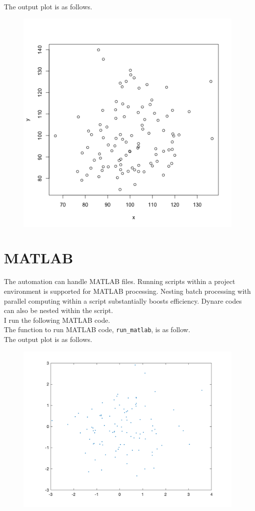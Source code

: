 \documentclass[12pt, a4paper]{article}
\begin{document}


The output plot is as follows.\\

\begin{figure}[H]
	\includegraphics[width=.5\textwidth]{sample_r_graph.png}
\end{figure}

\section{MATLAB}

The automation can handle MATLAB files. Running scripts within a project environment is supported for MATLAB processing. Nesting batch processing with parallel computing within a script substantially boosts efficiency. Dynare codes can also be nested within the script.\\

I run the following MATLAB code.\\



The function to run MATLAB code, \texttt{run\_matlab}, is as follow.\\



The output plot is as follows.\\

\begin{figure}[H]
	\includegraphics[width=.5\textwidth]{sample_matlab_graph.png}
\end{figure}
\end{document}
